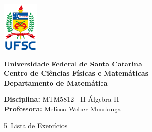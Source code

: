 \documentclass[12pt]{article}
\begin{document}
\ \vspace{-1.4cm}
\begin{tcolorbox}[colback=black!0]
    \noindent
    \begin{minipage}{0.14\linewidth}
        \hspace*{-0.2cm}\includegraphics[height = 2.5cm]{UFSC.png}
    \end{minipage}
	\noindent
	\begin{minipage}{0.79\linewidth}
	    \begin{center}
	        \vspace*{0.2cm}
	        {\bf \large Universidade Federal de Santa Catarina} \\ \vspace{0.3cm}
			{\bf \large Centro de Ciências Físicas e Matemáticas} \\ \vspace{0.3cm}
			{\bf \large Departamento de Matemática}
		\end{center}
	\end{minipage}
\end{tcolorbox}

\noindent\textbf{Disciplina:} MTM5812 - H-Álgebra II\\
\textbf{Professora:} Melissa Weber Mendonça

\begin{center}
    \Large{5\textordfeminine\ Lista de Exercícios}
\end{center}
\end{document}
